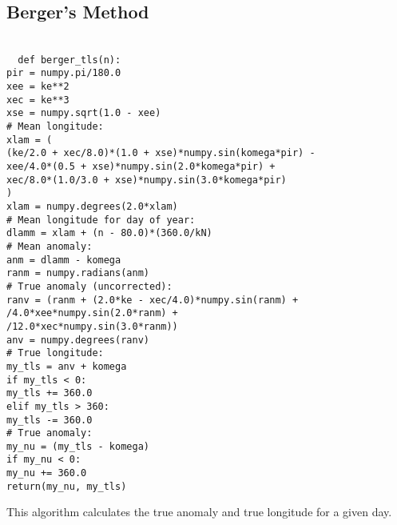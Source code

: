 \subsection{Berger's Method}
\label{app:berger}
\texttt{ \\
~~def berger\_tls(n):\\
 \indent pir = numpy.pi/180.0 \\
 \indent xee = ke**2 \\
 \indent xec = ke**3 \\
 \indent xse = numpy.sqrt(1.0 - xee) \\
 \indent \# Mean longitude: \\
 \indent xlam = ( \\
 \indent \indent (ke/2.0 + xec/8.0)*(1.0 + xse)*numpy.sin(komega*pir) -  \\
 \indent \indent xee/4.0*(0.5 + xse)*numpy.sin(2.0*komega*pir) +  \\
 \indent \indent xec/8.0*(1.0/3.0 + xse)*numpy.sin(3.0*komega*pir) \\
 \indent \indent ) \\
 \indent xlam = numpy.degrees(2.0*xlam) \\
 \indent \# Mean longitude for day of year: \\
 \indent dlamm = xlam + (n - 80.0)*(360.0/kN) \\
 \indent \# Mean anomaly: \\
 \indent anm = dlamm - komega \\
 \indent ranm = numpy.radians(anm) \\
 \indent \# True anomaly (uncorrected): \\
 \indent ranv = (ranm + (2.0*ke - xec/4.0)*numpy.sin(ranm) +  \\
 \indent {}/4.0*xee*numpy.sin(2.0*ranm) +  \\
 \indent {}/12.0*xec*numpy.sin(3.0*ranm)) \\
 \indent anv = numpy.degrees(ranv) \\
 \indent \# True longitude: \\
 \indent my\_tls = anv + komega \\
 \indent if my\_tls < 0: \\
 \indent \indent my\_tls += 360.0 \\
 \indent elif my\_tls > 360: \\
 \indent \indent my\_tls -= 360.0 \\
 \indent \# True anomaly: \\
 \indent my\_nu = (my\_tls - komega) \\
 \indent if my\_nu < 0: \\
 \indent \indent my\_nu += 360.0 \\
 \indent return(my\_nu, my\_tls) \\
}

This algorithm calculates the true anomaly and true longitude for a given day.